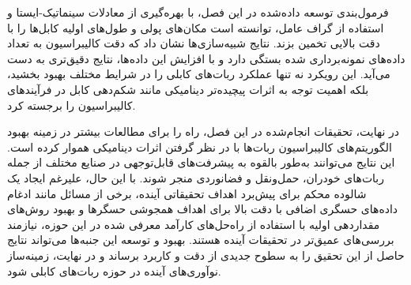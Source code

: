 فرمول‌بندی توسعه داده‌شده در این فصل، با بهره‌گیری از معادلات سینماتیک-ایستا و استفاده از گراف عامل، توانسته است مکان‌های پولی و طول‌های اولیه کابل‌ها را با دقت بالایی تخمین بزند. نتایج شبیه‌سازی‌ها نشان داد که دقت کالیبراسیون به تعداد داده‌های نمونه‌برداری شده بستگی دارد و با افزایش این داده‌ها، نتایج دقیق‌تری به دست می‌آید. این رویکرد نه تنها عملکرد ربات‌های کابلی را در شرایط مختلف بهبود بخشید، بلکه اهمیت توجه به اثرات پیچیده‌تر دینامیکی مانند شکم‌دهی کابل در فرآیندهای کالیبراسیون را برجسته کرد.

در نهایت، تحقیقات انجام‌شده در این فصل، راه را برای مطالعات بیشتر در زمینه بهبود الگوریتم‌های کالیبراسیون ربات‌ها با در نظر گرفتن اثرات دینامیکی هموار کرده است. این نتایج می‌توانند به‌طور بالقوه به پیشرفت‌های قابل‌توجهی در صنایع مختلف از جمله ربات‌های خودران، حمل‌ونقل و فضانوردی منجر شوند. با این حال، علیرغم ایجاد یک شالوده محکم برای پیش‌برد اهداف تحقیقاتی آینده، برخی از مسائل مانند ادغام داده‌های حسگری اضافی با دقت بالا برای اهداف همجوشی حسگرها و بهبود روش‌های مقداردهی اولیه با استفاده از راه‌حل‌های کارآمد معرفی شده در این حوزه، نیازمند بررسی‌های عمیق‌تر در تحقیقات آینده هستند. بهبود و توسعه این جنبه‌ها می‌تواند نتایج حاصل از این تحقیق را به سطوح جدیدی از دقت و کاربرد برساند و در نهایت، زمینه‌ساز نوآوری‌های آینده در حوزه ربات‌های کابلی شود.



